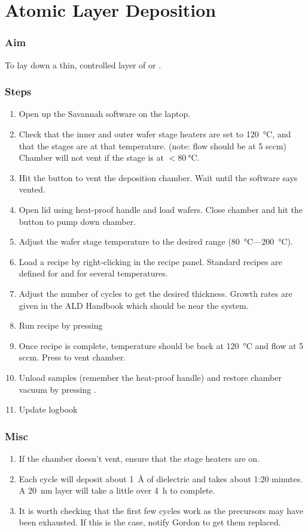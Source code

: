 \section{Atomic Layer Deposition}
\subsubsection{Aim}
To lay down a thin, controlled layer of  or .

\subsubsection{Steps}
\begin{enumerate}
\item Open up the Savannah software on the laptop.
\item Check that the inner and outer wafer stage heaters are set to \SI{120}{\degreeCelsius}, and that the stages
are at that temperature. (note:  flow should be at 5 sccm) Chamber will not vent if the stage is at $<\SI{80}{\degreeCelsius}$.
\item Hit the  button to vent the deposition chamber. Wait until the software says vented.
\item Open lid using heat-proof handle and load wafers. Close chamber and hit the  button to pump down chamber.
\item Adjust the wafer stage temperature to the desired range (\SI{80}{\degreeCelsius}---\SI{200}{\degreeCelsius}).
\item Load a recipe by right-clicking in the recipe panel. Standard recipes are defined for  and  for several temperatures.
\item Adjust the number of cycles to get the desired thickness. Growth rates are given in the ALD Handbook which should be near the system.
\item Run recipe by pressing 
\item Once recipe is complete, temperature should be back at \SI{120}{\degreeCelsius} and  flow at 5 sccm. Press  to vent chamber.
\item Unload samples (remember the heat-proof handle) and restore chamber vacuum by pressing .
\item Update logbook
\end{enumerate}

\subsubsection{Misc}
\begin{enumerate}
\item If the chamber doesn't vent, ensure that the stage heaters are on.
\item Each cycle will deposit about \SI{1}{\angstrom} of dielectric and takes about 1:20 minutes. A \SI{20}{\nano\meter} layer
will take a little over \SI{4}{\hour} to complete.
\item It is worth checking that the first few cycles work as the precursors may have been exhausted. If this is the case, notify Gordon to get them replaced.
\end{enumerate}
\newpage

